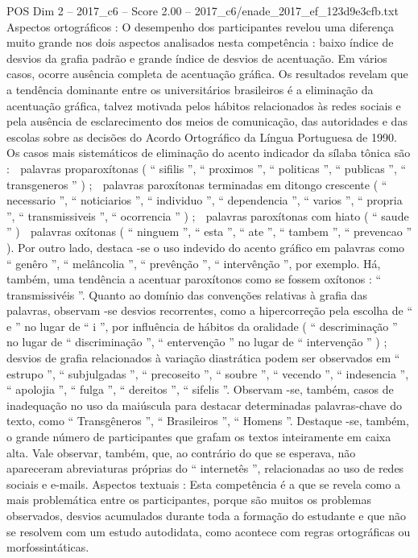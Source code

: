 \begin{textsample}{POS Dim 2 – 2017\_c6 – Score 2.00 – 2017\_c6/enade\_2017\_ef\_123d9e3cfb.txt}
Aspectos ortográficos : O desempenho dos participantes revelou uma diferença muito grande nos dois aspectos analisados nesta competência : baixo índice de desvios da grafia padrão e grande índice de desvios de acentuação.
Em vários casos, ocorre ausência completa de acentuação gráfica.
Os resultados revelam que a tendência dominante entre os universitários brasileiros é a eliminação da acentuação gráfica, talvez motivada pelos hábitos relacionados às redes sociais e pela ausência de esclarecimento dos meios de comunicação, das autoridades e das escolas sobre as decisões do Acordo Ortográfico da Língua Portuguesa de 1990.
Os casos mais sistemáticos de eliminação do acento indicador da sílaba tônica são :  palavras proparoxítonas ( “ sifilis ”, “ proximos ”, “ politicas ”, “ publicas ”, “ transgeneros ” ) ;  palavras paroxítonas terminadas em ditongo crescente ( “ necessario ”, “ noticiarios ”, “ individuo ”, “ dependencia ”, “ varios ”, “ propria ”, “ transmissiveis ”, “ ocorrencia ” ) ;  palavras paroxítonas com hiato ( “ saude ” )  palavras oxítonas ( “ ninguem ”, “ esta ”, “ ate ”, “ tambem ”, “ prevencao ” ).
Por outro lado, destaca -se o uso indevido do acento gráfico em palavras como “ genêro ”, “ melâncolia ”, “ prevênção ”, “ intervênção ”, por exemplo.
Há, também, uma tendência a acentuar paroxítonos como se fossem oxítonos : “ transmissivéis ”.
Quanto ao domínio das convenções relativas à grafia das palavras, observam -se desvios recorrentes, como a hipercorreção pela escolha de “ e ” no lugar de “ i ”, por influência de hábitos da oralidade ( “ descriminação ” no lugar de “ discriminação ”, “ entervenção ” no lugar de “ intervenção ” ) ; desvios de grafia relacionados à variação diastrática podem ser observados em “ estrupo ”, “ subjulgadas ”, “ precoseito ”, “ soubre ”, “ vecendo ”, “ indesencia ”, “ apolojia ”, “ fulga ”, “ dereitos ”, “ sifelis ”.
Observam -se, também, casos de inadequação no uso da maiúscula para destacar determinadas palavras-chave do texto, como “ Transgêneros ”, “ Brasileiros ”, “ Homens ”.
Destaque -se, também, o grande número de participantes que grafam os textos inteiramente em caixa alta.
Vale observar, também, que, ao contrário do que se esperava, não apareceram abreviaturas próprias do “ internetês ”, relacionadas ao uso de redes sociais e e-mails.
Aspectos textuais : Esta competência é a que se revela como a mais problemática entre os participantes, porque são muitos os problemas observados, desvios acumulados durante toda a formação do estudante e que não se resolvem com um estudo autodidata, como acontece com regras ortográficas ou morfossintáticas.

\end{textsample}
